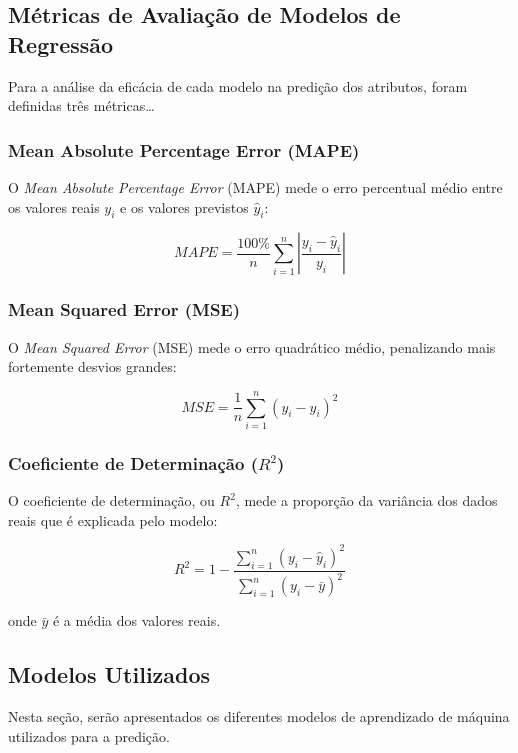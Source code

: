 \documentclass{article}
\begin{document}
\newpage


\subsection{Métricas de Avaliação de Modelos de Regressão}

Para a análise da eficácia de cada modelo na predição dos atributos, foram definidas três métricas\dots

\subsubsection{Mean Absolute Percentage Error (MAPE)}

O \textit{Mean Absolute Percentage Error} (MAPE) mede o erro percentual médio entre
os valores reais $y_i$ e os valores previstos $\hat{y}_i$:

\[
MAPE = \frac{100\%}{n} \sum_{i=1}^{n} \left| \frac{y_i - \hat{y}_i}{y_i} \right|
\]



\subsubsection{Mean Squared Error (MSE)}

O \textit{Mean Squared Error} (MSE) mede o erro quadrático médio, penalizando mais
fortemente desvios grandes:

\[
MSE = \frac{1}{n} \sum_{i=1}^{n} (y_i - \hat{y}_i)^2
\]



\subsubsection{Coeficiente de Determinação ($R^2$)}

O coeficiente de determinação, ou $R^2$, mede a proporção da variância dos dados
reais que é explicada pelo modelo:

\[
R^2 = 1 - \frac{\sum_{i=1}^{n} (y_i - \hat{y}_i)^2}{\sum_{i=1}^{n} (y_i - \bar{y})^2}
\]

onde $\bar{y}$ é a média dos valores reais.


\newpage



\subsection{Modelos Utilizados}

Nesta seção, serão apresentados os diferentes modelos de aprendizado de máquina utilizados para a predição. 
\end{document}
